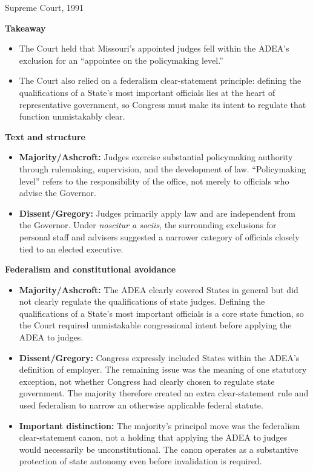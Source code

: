 \documentclass[11pt]{tex/lawoutline}
\begin{document}
{Supreme Court, 1991}
{
\textbf{Takeaway}
\begin{itemize}
    \item The Court held that Missouri's appointed judges fell within the ADEA's exclusion for an ``appointee on the policymaking level.''
    \item The Court also relied on a federalism clear-statement principle: defining the qualifications of a State's most important officials lies at the heart of representative government, so Congress must make its intent to regulate that function unmistakably clear.
\end{itemize}

\textbf{Text and structure}
\begin{itemize}
    \item \textbf{Majority/Ashcroft:} Judges exercise substantial policymaking authority through rulemaking, supervision, and the development of law. ``Policymaking level'' refers to the responsibility of the office, not merely to officials who advise the Governor.
    \item \textbf{Dissent/Gregory:} Judges primarily apply law and are independent from the Governor. Under \textit{noscitur a sociis}, the surrounding exclusions for personal staff and advisers suggested a narrower category of officials closely tied to an elected executive.
\end{itemize}

\textbf{Federalism and constitutional avoidance}
\begin{itemize}
    \item \textbf{Majority/Ashcroft:} The ADEA clearly covered States in general but did not clearly regulate the qualifications of state judges. Defining the qualifications of a State's most important officials is a core state function, so the Court required unmistakable congressional intent before applying the ADEA to judges.
    \item \textbf{Dissent/Gregory:} Congress expressly included States within the ADEA's definition of employer. The remaining issue was the meaning of one statutory exception, not whether Congress had clearly chosen to regulate state government. The majority therefore created an extra clear-statement rule and used federalism to narrow an otherwise applicable federal statute.
    \item \textbf{Important distinction:} The majority's principal move was the federalism clear-statement canon, not a holding that applying the ADEA to judges would necessarily be unconstitutional. The canon operates as a substantive protection of state autonomy even before invalidation is required.
\end{itemize}
}
\end{document}
